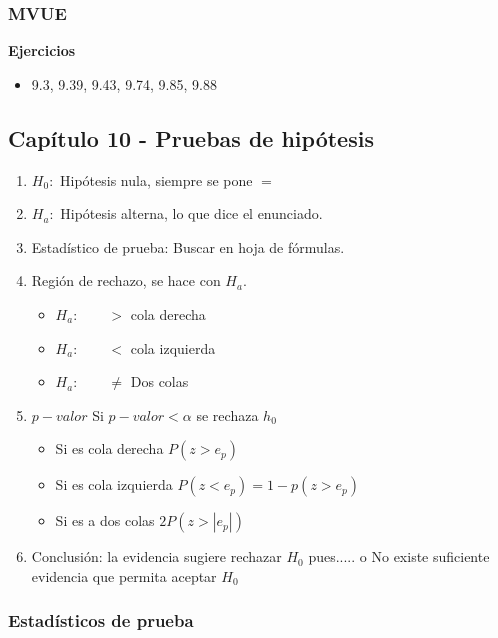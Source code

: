 \subsubsection{MVUE}
\textbf{Ejercicios}
\begin{itemize}
	\item 9.3, 9.39, 9.43, 9.74, 9.85, 9.88
\end{itemize}

\subsection{Capítulo 10 - Pruebas de hipótesis}

\begin{enumerate}
	\item $H_0:$ Hipótesis nula, siempre se pone $=$
	\item $H_a:$ Hipótesis alterna, lo que dice el enunciado.
	\item Estadístico de prueba: Buscar en hoja de fórmulas.
	\item Región de rechazo, se hace con $H_a$.
	\begin{itemize}
		\item $H_a: \qquad >$ cola derecha
		\item $H_a: \qquad <$ cola izquierda
		\item $H_a: \qquad \not =$ Dos colas
	\end{itemize}
\item $p-valor$
	Si $p-valor<\alpha$ se rechaza $h_0$
	\begin{itemize}
		\item Si es cola derecha $P(z>e_p)$
		\item Si es cola izquierda $P(z<e_p)=1-p(z>e_p)$
		\item Si es a dos colas $2P(z>|e_p|)$
	\end{itemize}
	\item Conclusión: la evidencia sugiere rechazar $H_0$ pues..... o No existe suficiente evidencia que permita aceptar $H_0$
\end{enumerate}

\subsubsection{Estadísticos de prueba}

